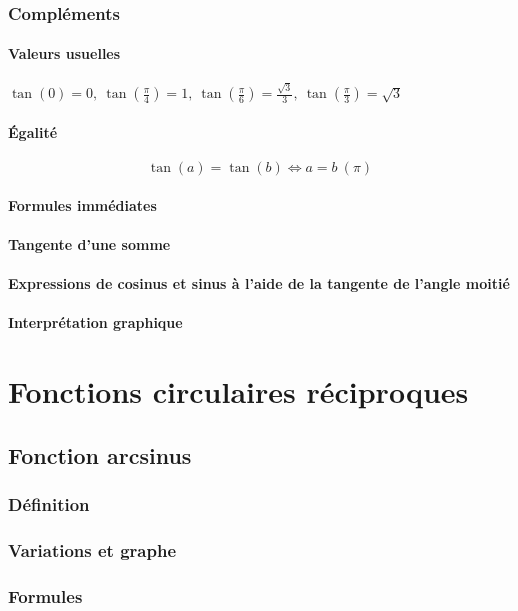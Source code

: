 \documentclass[12pt,a4paper,french]{book}
\begin{document}
		\subsection{Compléments}
			\subsubsection{Valeurs usuelles}
			$\tan (0) = 0, \ \tan\left( \frac{\pi}{4} \right) = 1, \ \tan\left( \frac{\pi}{6} \right) =\frac{\sqrt{3}}{3}, \ \tan\left( \frac{\pi}{3} \right) = \sqrt{3} $
			\subsubsection{Égalité}
			\[\tan(a) = \tan(b) \Leftrightarrow a = b \ (\pi)\]
			\subsubsection{Formules immédiates}
			\subsubsection{Tangente d'une somme}
			\subsubsection{Expressions de cosinus et sinus à l'aide de la tangente de l'angle moitié}
			\subsubsection{Interprétation graphique}
			
\chapter{Fonctions circulaires réciproques}
	\section{Fonction arcsinus}
		\subsection{Définition}
		\subsection{Variations et graphe}
		\subsection{Formules}
\end{document}
